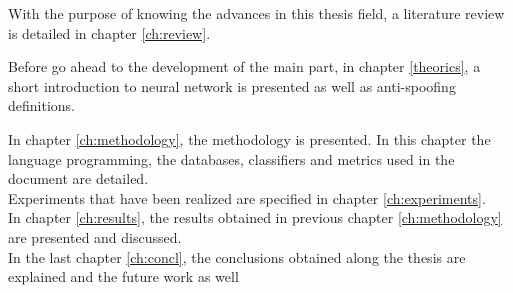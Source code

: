 With the purpose of knowing the advances in this thesis field, a literature review is detailed in chapter \ref{ch:review}.

Before go ahead to the development of the main part, in chapter \ref{theorics}, a short introduction to neural network is presented as well as anti-spoofing definitions.

In chapter \ref{ch:methodology}, the methodology is presented. In this chapter the language programming, the databases, classifiers and metrics used in the document are detailed.\\

Experiments that have been realized are specified in chapter \ref{ch:experiments}.\\

In chapter \ref{ch:results}, the results obtained in previous chapter \ref{ch:methodology} are presented and discussed.\\

In the last chapter \ref{ch:concl}, the conclusions obtained along the thesis are explained and the future work as well\\

